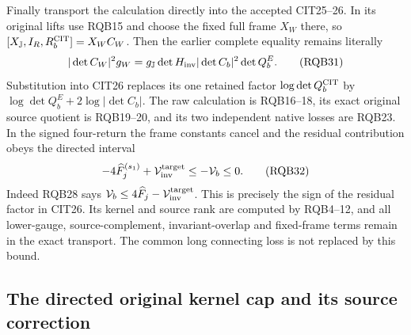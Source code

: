 \documentclass[10pt]{article}
\begin{document}
Finally transport the calculation directly into the accepted CIT25--26.
In its original lifts use RQB15 and choose the fixed full frame $X_W$
there, so $[X_{\mathbb J},I_R,R_b^{\rm CIT}]=X_WC_W$.
Then the earlier complete equality remains literally
\[
 |\det C_W|^2g_W
    =g_{\mathbb J}\det H_{\rm inv}
                         |\det C_b|^2\det Q_b^E .
 \tag{RQB31}
\]
Substitution into CIT26 replaces its one retained factor
$\log\det Q_b^{\rm CIT}$ by
$\log\det Q_b^E+2\log|\det C_b|$. The raw calculation is RQB16--18,
its exact original source quotient is RQB19--20, and its two
independent native losses are RQB23. In the signed four-return
the frame constants cancel and the residual contribution obeys
the directed interval
\[
 -4\widehat F_j^{(s_1)}
       +\mathcal V_{\rm inv}^{\rm target}
             \le-\mathcal V_b\le0 .
 \tag{RQB32}
\]
Indeed RQB28 says
$\mathcal V_b\le4\widehat F_j-\mathcal V_{\rm inv}^{\rm target}$.
This is precisely the sign of the residual factor in CIT26.
Its kernel and source rank are computed by RQB4--12, and all
lower-gauge, source-complement, invariant-overlap and fixed-frame
terms remain in the exact transport. The common long connecting
loss is not replaced by this bound.

\subsection{The directed original kernel cap and its source correction}
\end{document}
